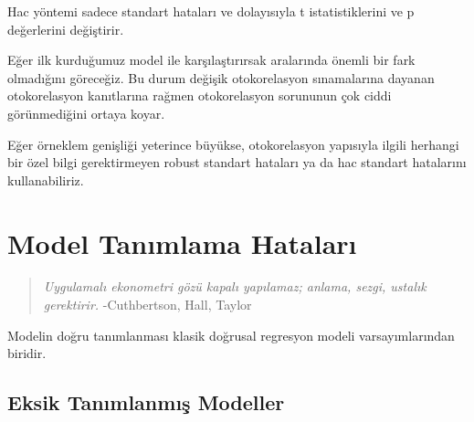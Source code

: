 \documentclass[
]{book}
\newenvironment{Shaded}{\begin{snugshade}}{\end{snugshade}}
\newcommand{\KeywordTok}[1]{\textcolor[rgb]{0.13,0.29,0.53}{\textbf{#1}}}
\newcommand{\NormalTok}[1]{#1}
\newcommand{\OperatorTok}[1]{\textcolor[rgb]{0.81,0.36,0.00}{\textbf{#1}}}
\newcommand{\StringTok}[1]{\textcolor[rgb]{0.31,0.60,0.02}{#1}}
\begin{document}
Hac yöntemi sadece standart hataları ve dolayısıyla t istatistiklerini ve p değerlerini değiştirir.

Eğer ilk kurduğumuz model ile karşılaştırırsak aralarında önemli bir fark olmadığını göreceğiz. Bu durum değişik otokorelasyon sınamalarına dayanan otokorelasyon kanıtlarına rağmen otokorelasyon sorununun çok ciddi görünmediğini ortaya koyar.

Eğer örneklem genişliği yeterince büyükse, otokorelasyon yapısıyla ilgili herhangi bir özel bilgi gerektirmeyen robust standart hataları ya da hac standart hatalarını kullanabiliriz.

\hypertarget{model-tanux131mlama-hatalarux131}{%
\chapter{Model Tanımlama Hataları}\label{model-tanux131mlama-hatalarux131}}

\begin{quote}
\emph{Uygulamalı ekonometri gözü kapalı yapılamaz; anlama, sezgi, ustalık gerektirir.} -Cuthbertson, Hall, Taylor
\end{quote}

Modelin doğru tanımlanması klasik doğrusal regresyon modeli varsayımlarından biridir.

\begin{Shaded}
\end{Shaded}

\hypertarget{eksik-tanux131mlanmux131ux15f-modeller}{%
\section{Eksik Tanımlanmış Modeller}\label{eksik-tanux131mlanmux131ux15f-modeller}}
\end{document}
